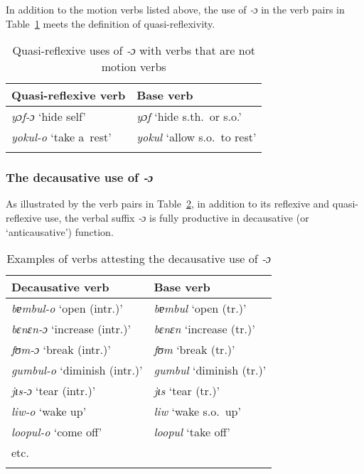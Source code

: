 \documentclass[output=paper]{langscibook}
\begin{document}
In addition to the motion verbs listed above, the use of \textit{‑ɔ} in the verb
pairs in Table~\ref{tab:Creissels:o-quasi-refl} meets the definition of
quasi-reflexivity.

\begin{table}[ht]
  \centering
  \begin{tabular}{ll}
    \lsptoprule
   {Quasi-reflexive verb} & {Base verb} \\
    \hline
    \textit{yɔf-ɔ} `hide self' & \textit{yɔf} `hide s.th.\ or s.o.' \\
    \textit{yokul-o} `take a~rest' & \textit{yokul} `allow s.o.\ to rest' \\
    \lspbottomrule
  \end{tabular}
  \caption{Quasi-reflexive uses of \textit{‑ɔ} with verbs that are not motion verbs}%
  \label{tab:Creissels:o-quasi-refl}
\end{table}

\subsubsection{The decausative use of \textit{‑ɔ}}%
\label{sec:Creissels:decausative-o}

As illustrated by the verb pairs in Table~\ref{tab:Creissels:decausative-o}, in
addition to its reflexive and quasi-reflexive use, the verbal suffix \textit{‑ɔ}
is fully productive in decausative (or `anticausative') function.

\begin{table}[ht]
  \centering
  \begin{tabular}{ll}
    \lsptoprule
    {Decausative verb} & {Base verb} \\
    \hline
    \textit{bɐmbul-o} `open (intr.)' & \textit{bɐmbul} `open (tr.)' \\
    \textit{bɛnɛn-ɔ} `increase (intr.)' & \textit{bɛnɛn} `increase (tr.)' \\
    \textit{fʊm-ɔ} `break (intr.)' & \textit{fʊm} `break (tr.)' \\
    \textit{gumbul-o} `diminish (intr.)' & \textit{gumbul} `diminish (tr.)' \\
    \textit{jɩs-ɔ} `tear (intr.)' & \textit{jɩs} `tear (tr.)' \\
    \textit{liw-o} `wake up' & \textit{liw} `wake s.o.\ up' \\
    \textit{loopul-o} `come off' & \textit{loopul} `take off' \\
    etc. & \\
    \lspbottomrule
  \end{tabular}
  \caption{Examples of verbs attesting the decausative use of \textit{‑ɔ}}%
  \label{tab:Creissels:decausative-o}
\end{table}
\end{document}

